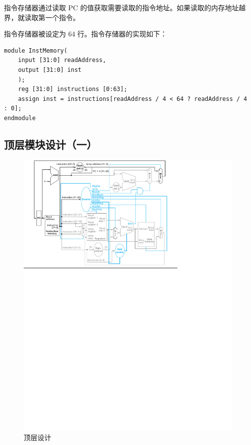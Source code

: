 \documentclass[a4paper,UTF8]{ctexart}
\begin{document}
指令存储器通过读取 PC 的值获取需要读取的指令地址。如果读取的内存地址越界，就读取第一个指令。

指令存储器被设定为 64 行。指令存储器的实现如下：

\begin{lstlisting}[caption=InstMemory.v]
module InstMemory(
    input [31:0] readAddress,
    output [31:0] inst
    );
    reg [31:0] instructions [0:63];
    assign inst = instructions[readAddress / 4 < 64 ? readAddress / 4 : 0];
endmodule
\end{lstlisting}

\subsection{顶层模块设计（一）}

\begin{figure}[H]
    \centering
    \includegraphics[width=\textwidth]{struct.pdf}
    \caption{顶层设计}
    \label{fig:top}
\end{figure}
\end{document}
